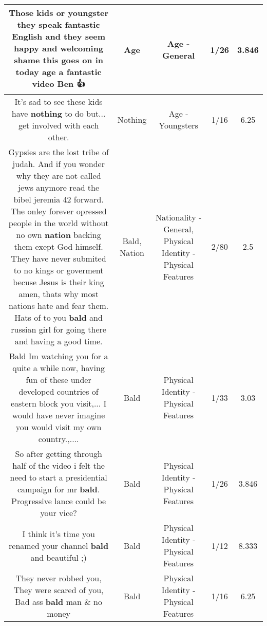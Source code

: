 \documentclass[11pt]{article}
\newlength\mylength
\begin{document}
\begin{center}
\begin{longtable}{|C{.65\mylength}|C{.30\mylength}|C{.12\mylength}|C{.12\mylength}|C{.12\mylength}|}
  \small Those kids or youngster they speak fantastic English and they seem happy and welcoming shame this goes on in today \textbf{age} a fantastic video Ben 👍\normalsize   & Age & Age - General & 1/26 & 3.846 \\  \hline
  \small It's sad to see these kids have \textbf{nothing} to do but... get involved with each other.\normalsize   & Nothing & Age - Youngsters & 1/16 & 6.25 \\  \hline
  \small Gypsies are the lost tribe of judah. And if you wonder why they are not called jews anymore read the bibel jeremia 42 forward. The onley forever opressed people in the world without no own \textbf{nation} backing them exept God himself. They have never submited to no kings or goverment becuse Jesus is their king amen, thats why most nations hate and fear them. Hats of to you \textbf{bald} and russian girl for going there and having a good time.\normalsize   & Bald, Nation & Nationality - General, Physical Identity - Physical Features & 2/80 & 2.5 \\  \hline
  \small Bald Im watching you for a quite a while now, having fun of these under developed countries of eastern block you visit,... I would have never imagine you would visit my own country.,....\normalsize   & Bald & Physical Identity - Physical Features & 1/33 & 3.03 \\  \hline
  \small So after getting through half of the video i felt the need to start a presidential campaign for mr \textbf{bald}. Progressive lance could be your vice?\normalsize   & Bald & Physical Identity - Physical Features & 1/26 & 3.846 \\  \hline
  \small I think it's time you renamed your channel \textbf{bald} and beautiful ;)\normalsize   & Bald & Physical Identity - Physical Features & 1/12 & 8.333 \\  \hline
  \small They never robbed you, They were scared of you, Bad ass \textbf{bald} man \& no money\normalsize   & Bald & Physical Identity - Physical Features & 1/16 & 6.25 \\  \hline

\end{longtable}
\end{center}
\end{document}

